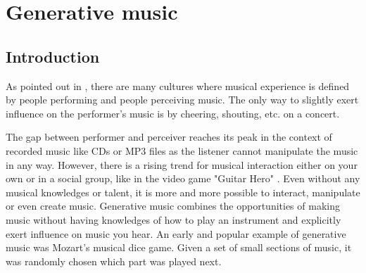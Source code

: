 	 

	\section{Generative music}
	

	\subsection{Introduction}
	As pointed out in \cite{Chandra2012}, there are many cultures where musical experience is defined by people performing and people perceiving music. 
	The only way to slightly exert influence on the performer's music is by cheering, shouting, etc. on a concert. 
	
	The gap between performer and perceiver reaches its peak in the context of recorded music like CDs or MP3 files as the listener cannot manipulate the music in any way. 
	However, there is a rising trend for musical interaction either on your own or in a social group, like in the video game "Guitar Hero" \cite{Chandra2012, Planck2009}. 
	Even without any musical knowledges or talent, it is more and more possible to interact, manipulate or even create music.
	Generative music combines the opportunities of making music without having knowledges of how to play an instrument and explicitly exert influence on music you hear.
	An early and popular example of generative music was Mozart's musical dice game. Given a set of small sections of music, it was randomly chosen which part was played next.


